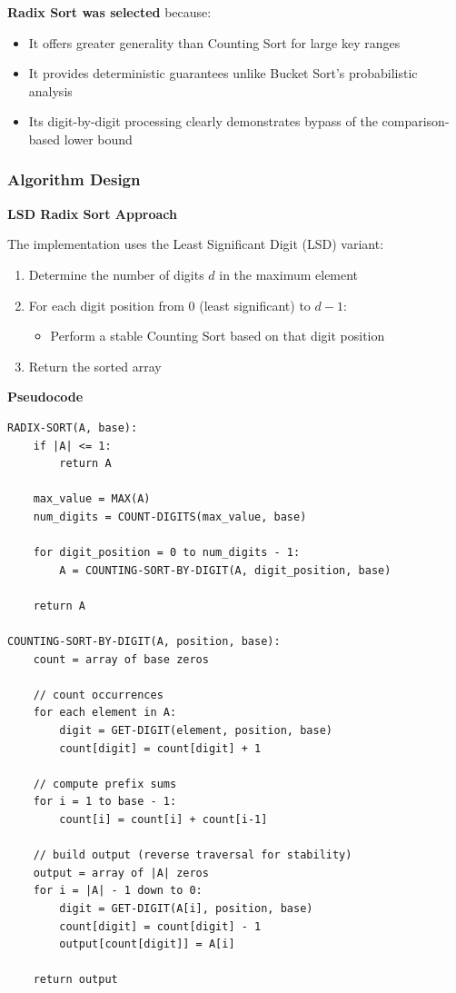 \documentclass[12pt]{article}
\begin{document}
\noindent \textbf{Radix Sort was selected} because:
\begin{itemize}
    \item It offers greater generality than Counting Sort for large key ranges
    \item It provides deterministic guarantees unlike Bucket Sort's probabilistic analysis
    \item Its digit-by-digit processing clearly demonstrates bypass of the comparison-based lower bound
\end{itemize}

\subsubsection{Algorithm Design}

\textbf{LSD Radix Sort Approach}

The implementation uses the Least Significant Digit (LSD) variant:
\begin{enumerate}
    \item Determine the number of digits $d$ in the maximum element
    \item For each digit position from 0 (least significant) to $d-1$:
    \begin{itemize}
        \item Perform a stable Counting Sort based on that digit position
    \end{itemize}
    \item Return the sorted array
\end{enumerate}

\textbf{Pseudocode}

\begin{lstlisting}
RADIX-SORT(A, base):
    if |A| <= 1:
        return A

    max_value = MAX(A)
    num_digits = COUNT-DIGITS(max_value, base)

    for digit_position = 0 to num_digits - 1:
        A = COUNTING-SORT-BY-DIGIT(A, digit_position, base)

    return A

COUNTING-SORT-BY-DIGIT(A, position, base):
    count = array of base zeros

    // count occurrences
    for each element in A:
        digit = GET-DIGIT(element, position, base)
        count[digit] = count[digit] + 1

    // compute prefix sums
    for i = 1 to base - 1:
        count[i] = count[i] + count[i-1]

    // build output (reverse traversal for stability)
    output = array of |A| zeros
    for i = |A| - 1 down to 0:
        digit = GET-DIGIT(A[i], position, base)
        count[digit] = count[digit] - 1
        output[count[digit]] = A[i]

    return output
\end{lstlisting}
\end{document}

